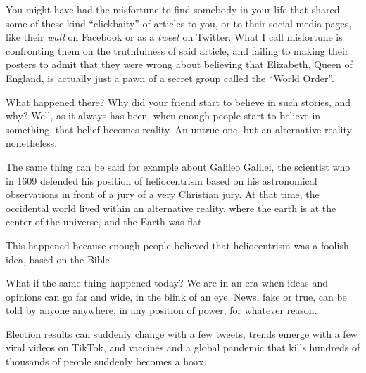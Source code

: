 You might have had the misfortune to find somebody in your life that shared some of these kind ``clickbaity'' of articles to you, or to their social media pages, like their \textit{wall} on Facebook or as a \textit{tweet} on Twitter. What I call misfortune is confronting them on the truthfulness of said article, and failing to making their posters to admit that they were wrong about believing that Elizabeth, Queen of England, is actually just a pawn of a secret group called the ``World Order''.

What happened there? Why did your friend start to believe in such stories, and why? Well, as it always has been, when enough people start to believe in something, that belief becomes reality. An untrue one, but an alternative reality nonetheless.

The same thing can be said for example about Galileo Galilei, the scientist who in 1609 defended his position of heliocentrism based on his astronomical observations in front of a jury of a very Christian jury. At that time, the occidental world lived within an alternative reality, where the earth is at the center of the universe, and the Earth was flat.

This happened because enough people believed that heliocentrism was a foolish idea, based on the Bible.

What if the same thing happened today? We are in an era when ideas and opinions can go far and wide, in the blink of an eye. News, fake or true, can be told by anyone anywhere, in any position of power, for whatever reason.

Election results can suddenly change with a few tweets, trends emerge with a few viral videos on TikTok, and vaccines and a global pandemic that kills hundreds of thousands of people suddenly becomes a hoax.
